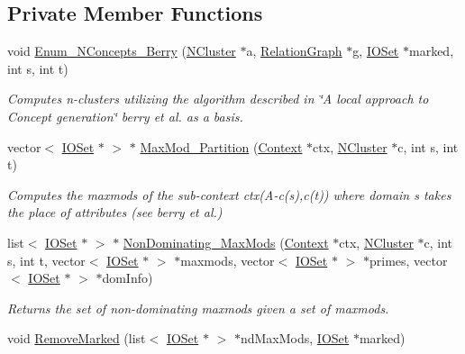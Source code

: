 \subsection*{Private Member Functions}
\begin{DoxyCompactItemize}
\item 
void \hyperlink{class_berry_lattice_algos_a0b2fefa9adf415442438b1bedbbfd317}{Enum\_\-NConcepts\_\-Berry} (\hyperlink{class_n_cluster}{NCluster} $\ast$a, \hyperlink{class_relation_graph}{RelationGraph} $\ast$g, \hyperlink{class_i_o_set}{IOSet} $\ast$marked, int s, int t)
\begin{DoxyCompactList}\small\item\em Computes n-\/clusters utilizing the algorithm described in \char`\"{}A local approach to Concept generation\char`\"{} berry et al. as a basis. \item\end{DoxyCompactList}\item 
vector$<$ \hyperlink{class_i_o_set}{IOSet} $\ast$ $>$ $\ast$ \hyperlink{class_berry_lattice_algos_a9aebe3a001353fc0b200f0c121def7fc}{MaxMod\_\-Partition} (\hyperlink{class_context}{Context} $\ast$ctx, \hyperlink{class_n_cluster}{NCluster} $\ast$c, int s, int t)
\begin{DoxyCompactList}\small\item\em Computes the maxmods of the sub-\/context ctx(A-\/c(s),c(t)) where domain s takes the place of attributes (see berry et al.) \item\end{DoxyCompactList}\item 
list$<$ \hyperlink{class_i_o_set}{IOSet} $\ast$ $>$ $\ast$ \hyperlink{class_berry_lattice_algos_a8edc5b3fcb0f597ccca4324fdee0deec}{NonDominating\_\-MaxMods} (\hyperlink{class_context}{Context} $\ast$ctx, \hyperlink{class_n_cluster}{NCluster} $\ast$c, int s, int t, vector$<$ \hyperlink{class_i_o_set}{IOSet} $\ast$ $>$ $\ast$maxmods, vector$<$ \hyperlink{class_i_o_set}{IOSet} $\ast$ $>$ $\ast$primes, vector$<$ \hyperlink{class_i_o_set}{IOSet} $\ast$ $>$ $\ast$domInfo)
\begin{DoxyCompactList}\small\item\em Returns the set of non-\/dominating maxmods given a set of maxmods. \item\end{DoxyCompactList}\item 
\hypertarget{class_berry_lattice_algos_a4e77968caf06f4b29704062c6834a329}{
void \hyperlink{class_berry_lattice_algos_a4e77968caf06f4b29704062c6834a329}{RemoveMarked} (list$<$ \hyperlink{class_i_o_set}{IOSet} $\ast$ $>$ $\ast$ndMaxMods, \hyperlink{class_i_o_set}{IOSet} $\ast$marked)}
\label{class_berry_lattice_algos_a4e77968caf06f4b29704062c6834a329}


\end{DoxyCompactItemize}
